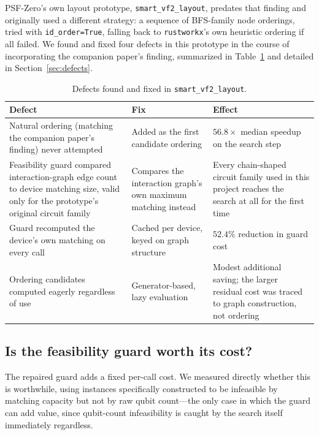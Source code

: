 \documentclass[11pt]{article}
\begin{document}
PSF-Zero's own layout prototype, \texttt{smart\_vf2\_layout}, predates
that finding and originally used a different strategy: a sequence of
BFS-family node orderings, tried with \texttt{id\_order=True}, falling
back to \texttt{rustworkx}'s own heuristic ordering if all failed. We
found and fixed four defects in this prototype in the course of
incorporating the companion paper's finding, summarized in
Table~\ref{tab:fixes} and detailed in Section~\ref{sec:defects}.

\begin{table}[h]
\centering
\begin{tabular}{p{}p{}p{}}
\toprule
Defect & Fix & Effect \\
\midrule
Natural ordering (matching the companion paper's finding) never
attempted & Added as the first candidate ordering & $56.8\times$ median
speedup on the search step \\
Feasibility guard compared interaction-graph edge count to device
matching size, valid only for the prototype's original circuit family &
Compares the interaction graph's own maximum matching instead & Every
chain-shaped circuit family used in this project reaches the search at
all for the first time \\
Guard recomputed the device's own matching on every call &
Cached per device, keyed on graph structure & $52.4\%$ reduction in
guard cost \\
Ordering candidates computed eagerly regardless of use &
Generator-based, lazy evaluation & Modest additional saving; the larger
residual cost was traced to graph construction, not ordering \\
\bottomrule
\end{tabular}
\caption{Defects found and fixed in \texttt{smart\_vf2\_layout}.}
\label{tab:fixes}
\end{table}

\subsection{Is the feasibility guard worth its cost?}

The repaired guard adds a fixed per-call cost. We measured directly
whether this is worthwhile, using instances specifically constructed to
be infeasible by matching capacity but not by raw qubit count---the
only case in which the guard can add value, since qubit-count
infeasibility is caught by the search itself immediately regardless.
\end{document}
